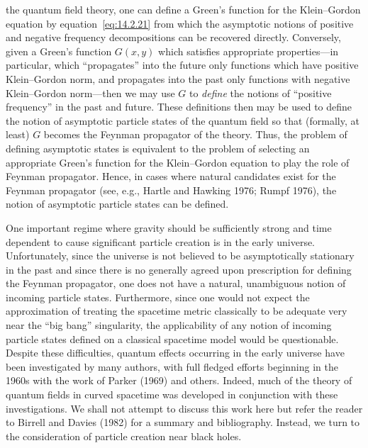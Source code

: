 the quantum field theory, one can define a Green's function for the Klein--Gordon
equation by equation~\eqref{eq:14.2.21} from which the asymptotic notions of
positive and negative frequency decompositions can be recovered directly.
Conversely, given a Green's function \(G(x,y)\) which satisfies appropriate
properties---in particular, which ``propagates'' into the future only functions which
have positive Klein--Gordon norm, and propagates into the past only functions with
negative Klein--Gordon norm---then we may use \(G\) to \emph{define} the notions
of ``positive frequency'' in the past and future. These definitions then may be used
to define the notion of asymptotic particle states of the quantum field so that
(formally, at least) \(G\) becomes the Feynman propagator of the theory. Thus, the
problem of defining asymptotic states is equivalent to the problem of selecting an
appropriate Green's function for the Klein--Gordon equation to play the role of
Feynman propagator. Hence, in cases where natural candidates exist for the Feynman
propagator (see, e.g., Hartle and Hawking 1976; Rumpf 1976), the notion of
asymptotic particle states can be defined.

One important regime where gravity should be sufficiently strong and time
dependent to cause significant particle creation is in the early universe.
Unfortunately, since the universe is not believed to be asymptotically stationary in
the past and since there is no generally agreed upon prescription for defining the
Feynman propagator, one does not have a natural, unambiguous notion of incoming
particle states. Furthermore, since one would not expect the approximation of
treating the spacetime metric classically to be adequate very near the ``big bang''
singularity, the applicability of any notion of incoming particle states defined on a
classical spacetime model would be questionable. Despite these difficulties, quantum
effects occurring in the early universe have been investigated by many authors, with
full fledged efforts beginning in the 1960s with the work of Parker (1969) and others.
Indeed, much of the theory of quantum fields in curved spacetime was developed in
conjunction with these investigations. We shall not attempt to discuss this work here
but refer the reader to Birrell and Davies (1982) for a summary and bibliography.
Instead, we turn to the consideration of particle creation near black holes.
